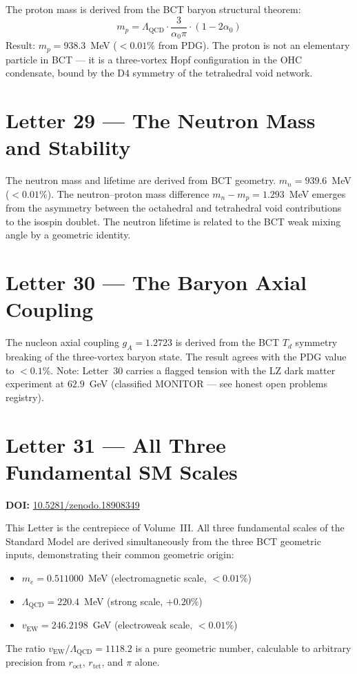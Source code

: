 \documentclass[aps,prl,twocolumn,showpacs,preprintnumbers]{revtex4-2}
\newcommand{\roct}{r_{\mathrm{oct}}}
\newcommand{\rtet}{r_{\mathrm{tet}}}
\newcommand{\LQCD}{\Lambda_{\mathrm{QCD}}}
\begin{document}
\medskip
The proton mass is derived from the BCT baryon structural theorem:
\begin{equation}
m_p = \LQCD \cdot \frac{3}{\alpha_0\pi} \cdot (1-2\alpha_0)
\end{equation}
Result: $m_p = 938.3$~MeV ($<0.01\%$ from PDG). The proton is
not an elementary particle in BCT --- it is a three-vortex Hopf
configuration in the OHC condensate, bound by the D4 symmetry
of the tetrahedral void network.

\section{Letter 29 --- The Neutron Mass and Stability}

\medskip
The neutron mass and lifetime are derived from BCT geometry.
$m_n = 939.6$~MeV ($<0.01\%$). The neutron--proton mass difference
$m_n - m_p = 1.293$~MeV emerges from the asymmetry between the
octahedral and tetrahedral void contributions to the isospin doublet.
The neutron lifetime is related to the BCT weak mixing angle by a
geometric identity.

\section{Letter 30 --- The Baryon Axial Coupling}

\medskip
The nucleon axial coupling $g_A = 1.2723$ is derived from the BCT
$T_d$ symmetry breaking of the three-vortex baryon state. The
result agrees with the PDG value to $<0.1\%$. Note: Letter~30
carries a flagged tension with the LZ dark matter experiment at
$62.9$~GeV (classified MONITOR --- see honest open problems registry).

\section{Letter 31 --- All Three Fundamental SM Scales}
\noindent\textbf{DOI:} \href{https://doi.org/10.5281/zenodo.18908349}{10.5281/zenodo.18908349}

\medskip
This Letter is the centrepiece of Volume~III. All three fundamental
scales of the Standard Model are derived simultaneously from the three
BCT geometric inputs, demonstrating their common geometric origin:
\begin{itemize}
  \item $m_e = 0.511000$~MeV (electromagnetic scale, $<0.01\%$)
  \item $\LQCD = 220.4$~MeV (strong scale, $+0.20\%$)
  \item $v_{\mathrm{EW}} = 246.2198$~GeV (electroweak scale, $<0.01\%$)
\end{itemize}
The ratio $v_{\mathrm{EW}}/\LQCD = 1118.2$ is a pure geometric number,
calculable to arbitrary precision from $\roct$, $\rtet$, and $\pi$ alone.
\end{document}
